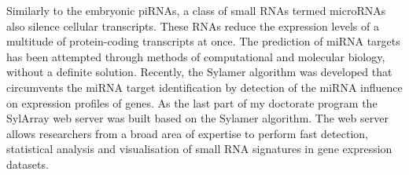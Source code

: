 \begin{abstracts}
Similarly to the embryonic piRNAs, a class of small RNAs termed microRNAs also silence cellular transcripts. These RNAs reduce the expression levels of a multitude of protein-coding transcripts at once. The prediction of miRNA targets has been attempted through methods of computational and molecular biology, without a definite solution. Recently, the Sylamer algorithm was developed that circumvents the miRNA target identification by detection of the miRNA influence on expression profiles of genes. As the last part of my doctorate program the SylArray web server was built based on the Sylamer algorithm. The web server allows researchers from a broad area of expertise to perform fast detection, statistical analysis and visualisation of small RNA signatures in gene expression datasets.

\end{abstracts}




